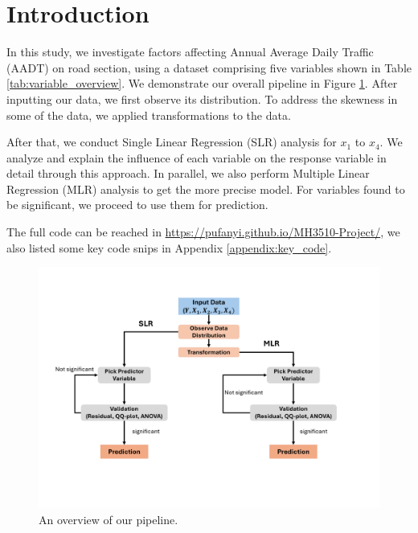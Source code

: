 \section{Introduction}

In this study, we investigate factors affecting Annual Average Daily Traffic (AADT) on road section, using a dataset comprising five variables shown in Table \ref{tab:variable_overview}. We demonstrate our overall pipeline in Figure \ref{fig:intro}. After inputting our data, we first observe its distribution. To address the skewness in some of the data, we applied transformations to the data. 

After that, we conduct Single Linear Regression (SLR) analysis for $x_1$ to $x_4$. We analyze and explain the influence of each variable on the response variable in detail through this approach. In parallel, we also perform Multiple Linear Regression (MLR) analysis to get the more precise model. For variables found to be significant, we proceed to use them for prediction.

The full code can be reached in \url{https://pufanyi.github.io/MH3510-Project/}, we also listed some key code snips in Appendix \ref{appendix:key_code}.

\begin{figure}[t]
    \centering
    \includegraphics[width=1\linewidth]{figures/Intro.pdf}
    \caption{An overview of our pipeline.}
    \label{fig:intro}
\end{figure}

